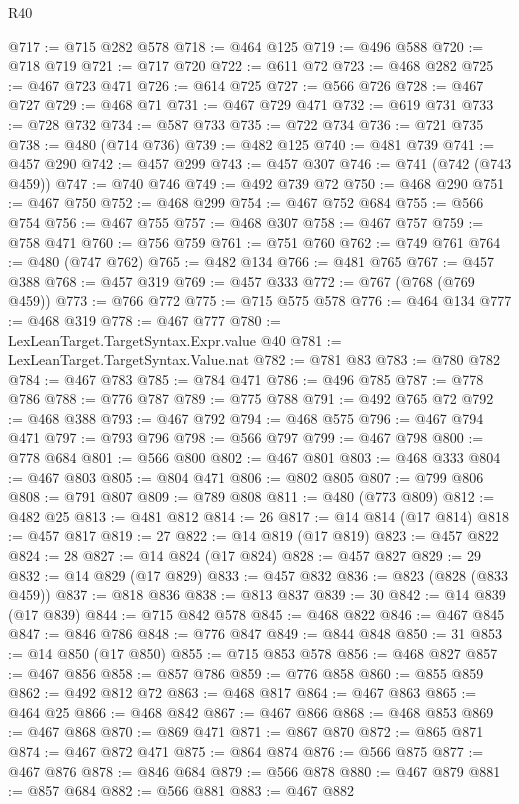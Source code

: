 \begin{lexlean}{R40}
\begin{coremodule}
@717 := @715 @282 @578
@718 := @464 @125
@719 := @496 @588
@720 := @718 @719
@721 := @717 @720
@722 := @611 @72
@723 := @468 @282
@725 := @467 @723 @471
@726 := @614 @725
@727 := @566 @726
@728 := @467 @727
@729 := @468 @71
@731 := @467 @729 @471
@732 := @619 @731
@733 := @728 @732
@734 := @587 @733
@735 := @722 @734
@736 := @721 @735
@738 := @480 (@714 @736)
@739 := @482 @125
@740 := @481 @739
@741 := @457 @290
@742 := @457 @299
@743 := @457 @307
@746 := @741 (@742 (@743 @459))
@747 := @740 @746
@749 := @492 @739 @72
@750 := @468 @290
@751 := @467 @750
@752 := @468 @299
@754 := @467 @752 @684
@755 := @566 @754
@756 := @467 @755
@757 := @468 @307
@758 := @467 @757
@759 := @758 @471
@760 := @756 @759
@761 := @751 @760
@762 := @749 @761
@764 := @480 (@747 @762)
@765 := @482 @134
@766 := @481 @765
@767 := @457 @388
@768 := @457 @319
@769 := @457 @333
@772 := @767 (@768 (@769 @459))
@773 := @766 @772
@775 := @715 @575 @578
@776 := @464 @134
@777 := @468 @319
@778 := @467 @777
@780 := LexLeanTarget.TargetSyntax.Expr.value @40
@781 := LexLeanTarget.TargetSyntax.Value.nat
@782 := @781 @83
@783 := @780 @782
@784 := @467 @783
@785 := @784 @471
@786 := @496 @785
@787 := @778 @786
@788 := @776 @787
@789 := @775 @788
@791 := @492 @765 @72
@792 := @468 @388
@793 := @467 @792
@794 := @468 @575
@796 := @467 @794 @471
@797 := @793 @796
@798 := @566 @797
@799 := @467 @798
@800 := @778 @684
@801 := @566 @800
@802 := @467 @801
@803 := @468 @333
@804 := @467 @803
@805 := @804 @471
@806 := @802 @805
@807 := @799 @806
@808 := @791 @807
@809 := @789 @808
@811 := @480 (@773 @809)
@812 := @482 @25
@813 := @481 @812
@814 := 26
@817 := @14 @814 (@17 @814)
@818 := @457 @817
@819 := 27
@822 := @14 @819 (@17 @819)
@823 := @457 @822
@824 := 28
@827 := @14 @824 (@17 @824)
@828 := @457 @827
@829 := 29
@832 := @14 @829 (@17 @829)
@833 := @457 @832
@836 := @823 (@828 (@833 @459))
@837 := @818 @836
@838 := @813 @837
@839 := 30
@842 := @14 @839 (@17 @839)
@844 := @715 @842 @578
@845 := @468 @822
@846 := @467 @845
@847 := @846 @786
@848 := @776 @847
@849 := @844 @848
@850 := 31
@853 := @14 @850 (@17 @850)
@855 := @715 @853 @578
@856 := @468 @827
@857 := @467 @856
@858 := @857 @786
@859 := @776 @858
@860 := @855 @859
@862 := @492 @812 @72
@863 := @468 @817
@864 := @467 @863
@865 := @464 @25
@866 := @468 @842
@867 := @467 @866
@868 := @468 @853
@869 := @467 @868
@870 := @869 @471
@871 := @867 @870
@872 := @865 @871
@874 := @467 @872 @471
@875 := @864 @874
@876 := @566 @875
@877 := @467 @876
@878 := @846 @684
@879 := @566 @878
@880 := @467 @879
@881 := @857 @684
@882 := @566 @881
@883 := @467 @882

\end{coremodule}
\end{lexlean}
